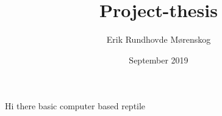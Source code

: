 \documentclass{article}
\title{Project-thesis}
\author{Erik Rundhovde M\o renskog}
\date{September 2019}
\begin{document}
\maketitle

Hi there basic computer based reptile
\end{document}
